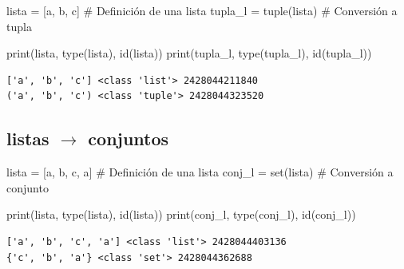\documentclass[
  spanish,
  letterpaper,
]{scrbook}
\newenvironment{Shaded}{\begin{snugshade}}{\end{snugshade}}
\newcommand{\BuiltInTok}[1]{\textcolor[rgb]{0.00,0.23,0.31}{#1}}
\newcommand{\CommentTok}[1]{\textcolor[rgb]{0.37,0.37,0.37}{#1}}
\newcommand{\NormalTok}[1]{\textcolor[rgb]{0.00,0.23,0.31}{#1}}
\newcommand{\OperatorTok}[1]{\textcolor[rgb]{0.37,0.37,0.37}{#1}}
\newcommand{\StringTok}[1]{\textcolor[rgb]{0.13,0.47,0.30}{#1}}
\theoremstyle{definition}
\theoremstyle{remark}
\begin{document}
\begin{Shaded}
\begin{Highlighting}[]
\NormalTok{lista }\OperatorTok{=}\NormalTok{ [}\StringTok{\textquotesingle{}a\textquotesingle{}}\NormalTok{, }\StringTok{\textquotesingle{}b\textquotesingle{}}\NormalTok{, }\StringTok{\textquotesingle{}c\textquotesingle{}}\NormalTok{] }\CommentTok{\# Definición de una lista}
\NormalTok{tupla\_l }\OperatorTok{=} \BuiltInTok{tuple}\NormalTok{(lista)  }\CommentTok{\# Conversión a tupla}

\BuiltInTok{print}\NormalTok{(lista, }\BuiltInTok{type}\NormalTok{(lista), }\BuiltInTok{id}\NormalTok{(lista))}
\BuiltInTok{print}\NormalTok{(tupla\_l, }\BuiltInTok{type}\NormalTok{(tupla\_l), }\BuiltInTok{id}\NormalTok{(tupla\_l))}
\end{Highlighting}
\end{Shaded}

\begin{verbatim}
['a', 'b', 'c'] <class 'list'> 2428044211840
('a', 'b', 'c') <class 'tuple'> 2428044323520
\end{verbatim}

\subsection{\texorpdfstring{listas \(\to\)
conjuntos}{listas \textbackslash to conjuntos}}\label{listas-to-conjuntos}

\begin{Shaded}
\begin{Highlighting}[]
\NormalTok{lista }\OperatorTok{=}\NormalTok{ [}\StringTok{\textquotesingle{}a\textquotesingle{}}\NormalTok{, }\StringTok{\textquotesingle{}b\textquotesingle{}}\NormalTok{, }\StringTok{\textquotesingle{}c\textquotesingle{}}\NormalTok{, }\StringTok{\textquotesingle{}a\textquotesingle{}}\NormalTok{] }\CommentTok{\# Definición de una lista}
\NormalTok{conj\_l }\OperatorTok{=} \BuiltInTok{set}\NormalTok{(lista)          }\CommentTok{\# Conversión a conjunto}

\BuiltInTok{print}\NormalTok{(lista, }\BuiltInTok{type}\NormalTok{(lista), }\BuiltInTok{id}\NormalTok{(lista))}
\BuiltInTok{print}\NormalTok{(conj\_l, }\BuiltInTok{type}\NormalTok{(conj\_l), }\BuiltInTok{id}\NormalTok{(conj\_l))}
\end{Highlighting}
\end{Shaded}

\begin{verbatim}
['a', 'b', 'c', 'a'] <class 'list'> 2428044403136
{'c', 'b', 'a'} <class 'set'> 2428044362688
\end{verbatim}
\end{document}
